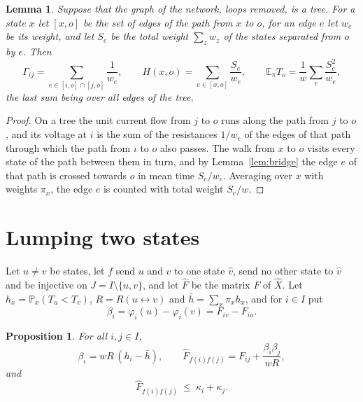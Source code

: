 \documentclass[11pt]{amsart}
\newtheorem{proposition}[theorem]{Proposition}
\newtheorem{lemma}[theorem]{Lemma}
\theoremstyle{definition}
\newcommand{\Prob}{\mathbb{P}}
\newcommand{\E}{\mathbb{E}}
\newcommand{\hX}{\widehat{X}}
\newcommand{\hF}{\widehat{F}}
\newcommand{\lra}{\leftrightarrow}
\begin{document}
\begin{lemma}\label{lem:tree}
Suppose that the graph of the network, loops removed, is a tree. For a state $x$ let $[x,o]$ be the set of edges of
the path from $x$ to $o$, for an edge $e$ let $w_e$ be its weight, and let $S_e$ be the total weight $\sum_zw_z$ of
the states separated from $o$ by $e$. Then
\[
\Gamma_{ij}=\sum_{e\in[i,o]\cap[j,o]}\frac1{w_e},\qquad H(x,o)=\sum_{e\in[x,o]}\frac{S_e}{w_e},\qquad
\E_\pi T_o=\frac1w\sum_e\frac{S_e^2}{w_e},
\]
the last sum being over all edges of the tree.
\end{lemma}
\begin{proof}
On a tree the unit current flow from $j$ to $o$ runs along the path from $j$ to $o$, and its voltage at $i$ is the
sum of the resistances $1/w_e$ of the edges of that path through which the path from $i$ to $o$ also passes. The walk
from $x$ to $o$ visits every state of the path between them in turn, and by Lemma~\ref{lem:bridge} the edge $e$ of
that path is crossed towards $o$ in mean time $S_e/w_e$. Averaging over $x$ with weights $\pi_x$, the edge $e$ is
counted with total weight $S_e/w$.
\end{proof}

\section{Lumping two states}\label{sec:merge}
Let $u\ne v$ be states, let $f$ send $u$ and $v$ to one state $\hat v$, send no other state to $\hat v$ and be injective on
$J=I\setminus\{u,v\}$, and
let $\hF$ be the matrix $F$ of $\hX$. Let $h_x=\Prob_x(T_u<T_v)$, $R=R(u\lra v)$ and $\bar h=\sum_x\pi_xh_x$, and for
$i\in I$ put
\[
\beta_i=\varphi_i(u)-\varphi_i(v)=F_{iv}-F_{iu}.
\]

\begin{proposition}\label{prop:rankone}
For all $i,j\in I$,
\[
\beta_i=wR\,(h_i-\bar h),\qquad \hF_{f(i)f(j)}=F_{ij}+\frac{\beta_i\beta_j}{wR},
\]
and
\begin{equation}\label{eq:twoterms}
\hF_{f(i)f(j)}\ \le\ \kappa_i+\kappa_j .
\end{equation}
\end{proposition}
\end{document}
